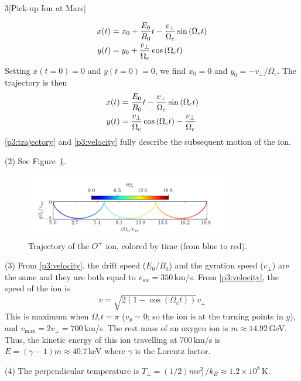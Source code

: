 \documentclass[12pt]{article}
\begin{document}
\begin{problem}{3}[Pick-up Ion at Mars]
\begin{solution}
    \begin{subequations}
        \begin{align}
            x(t)&=x_0+\frac{E_0}{B_0}t-\frac{v_\perp}{\Omega_c}\sin\qty(\Omega_ct)\\ 
            y(t)&=y_0+\frac{v_\perp}{\Omega_c}\cos\qty(\Omega_ct)
        \end{align} 
    \end{subequations}
    Setting $x(t=0)=0$ and $y(t=0)=0$, we find $x_0=0$ and
    $y_0=-v_\perp/\Omega_c$. The trajectory is then
    \begin{subequations}\label{p3:trajectory}
        \begin{align}
            x(t)&=\frac{E_0}{B_0}t-\frac{v_\perp}{\Omega_c}\sin\qty(\Omega_ct)\\ 
            y(t)&=\frac{v_\perp}{\Omega_c}\cos\qty(\Omega_ct)-\frac{v_\perp}{\Omega_c}
        \end{align} 
    \end{subequations}
    \eqref{p3:trajectory} and \eqref{p3:velocity} fully describe the subsequent
    motion of the ion.

    (2) See Figure~\ref{fig:p3}.
    \begin{figure}[h]
        \centering
        \includegraphics[width=0.8\textwidth]{p3.png}
        \caption{Trajectory of the $O^+$ ion, colored by time (from blue to
        red).}
        \label{fig:p3}
    \end{figure}

    (3) From \eqref{p3:velocity}, the drift speed ($E_0/B_0$) and the gyration 
    speed ($v_\perp$) are the same and they are both equal to
    $v_{sw}=350$\,\si{km/s}. From \eqref{p3:velocity}, the speed of the ion is
    \begin{equation}
        v=\sqrt{2(1-\cos(\Omega_ct))}v_\perp 
    \end{equation}
    This is maximum when $\Omega_ct=\pi$ ($v_y=0$; so the ion is at the turning 
    points in $y$), and $v_{\max}=2v_\perp=700$\,\si{km/s}. The rest mass of an
    oxygen ion is $m\approx14.92$\,\si{GeV}. Thus, the kinetic energy of this 
    ion travelling at $700$\,\si{km/s} is $E=(\gamma-1)m\approx40.7$\,\si{keV}
    where $\gamma$ is the Lorentz factor.

    (4) The perpendicular temperature is
    $T_\perp=(1/2)mv_\perp^2/k_B\approx1.2\times10^8$\,\si{K}.
\end{solution}
\end{problem}
\end{document}
